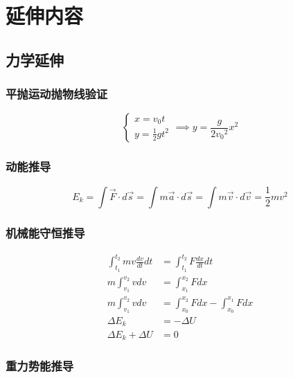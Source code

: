 
\chapter{延伸内容}

\section{力学延伸}

\subsection{平抛运动抛物线验证}

\begin{equation*}
    \begin{cases}
        x=v_0t\\
        y=\frac12gt^2
    \end{cases}\implies
    y=\frac{g}{2{v_0}^2}x^2
\end{equation*}

\subsection{动能推导}

\begin{equation*}
    E_k=\int\vec{F}\cdot d\vec{s}
        =\int m\vec{a}\cdot d\vec{s}
        =\int m\vec{v}\cdot d\vec{v}
        =\frac12mv^2
\end{equation*}

\subsection{机械能守恒推导}

\begin{align*}
    \int_{t_1}^{t_2}mv\frac{dv}{dt}dt&=\int_{t_1}^{t_2}F\frac{dx}{dt}dt\\
    m\int_{v_1}^{v_2}vdv&=\int_{x_1}^{x_2}Fdx\\
    m\int_{v_1}^{v_2}vdv&=\int_{x_0}^{x_2}Fdx-\int_{x_0}^{x_1}Fdx\\
    \Delta E_k&=-\Delta U\\
    \Delta E_k+\Delta U&=0
\end{align*}

\subsection{重力势能推导}

